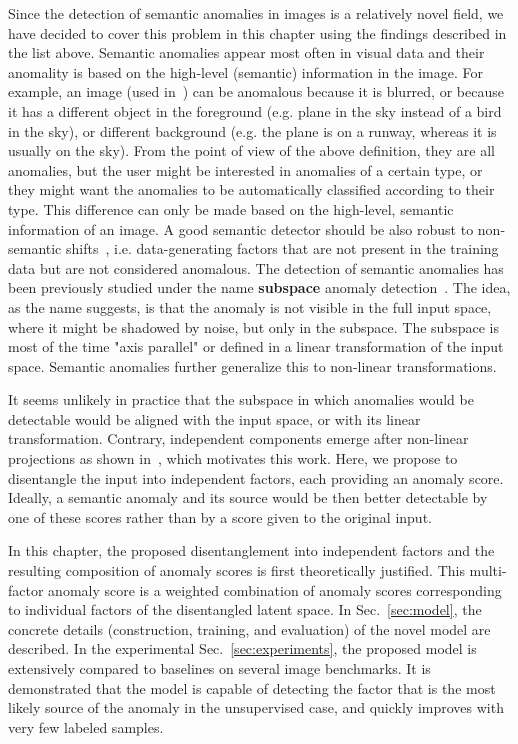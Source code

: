 Since the detection of semantic anomalies in images is a relatively novel field, we have decided to cover this problem in this chapter using the findings described in the list above. Semantic anomalies appear most often in visual data and their anomality is based on the high-level (semantic) information in the image. For example, an image (used in~\cite{vskvara2021comparison}) can be anomalous because it is blurred, or because it has a different object in the foreground (e.g. plane in the sky instead of a bird in the sky), or different background (e.g. the plane is on a runway, whereas it is usually on the sky). From the point of view of the above definition, they are all anomalies, but the user might be interested in anomalies of a certain type, or they might want the anomalies to be automatically classified according to their type. This difference can only be made based on the high-level, semantic information of an image. A good semantic detector should be also robust to non-semantic shifts~\cite{ahmed2021systematic}, i.e. data-generating factors that are not present in the training data but are not considered anomalous. The detection of semantic anomalies has been previously studied under the name \textbf{subspace} anomaly detection~\cite{raz2002semantic, kriegel2009outlier,rahmani2016randomized}. The idea, as the name suggests, is that the anomaly is not visible in the full input space, where it might be shadowed by noise, but only in the subspace. The subspace is most of the time "axis parallel" or defined in a linear transformation of the input space. Semantic anomalies further generalize this to non-linear transformations.

It seems unlikely in practice that the subspace in which anomalies would be detectable would be aligned with the input space, or with its linear transformation. Contrary, independent components emerge after non-linear projections as shown in~\cite{burgess2018understanding, kim2018disentangling, esmaeili2019structuredhfvae, tschannen2018recent, bai2021contrastively, kim2019bayes, deecke2021transfer}, which motivates this work. Here, we propose to disentangle the input into independent factors, each providing an anomaly score. Ideally, a semantic anomaly and its source would be then better detectable by one of these scores rather than by a score given to the original input. 

In this chapter, the proposed disentanglement into independent factors and the resulting composition of anomaly scores is first theoretically justified. This multi-factor anomaly score is a weighted combination of anomaly scores corresponding to individual factors of the disentangled latent space. In Sec.~\ref{sec:model}, the concrete details (construction, training, and evaluation) of the novel model are described. In the experimental Sec.~\ref{sec:experiments}, the proposed model is extensively compared to baselines on several image benchmarks. It is demonstrated that the model is capable of detecting the factor that is the most likely source of the anomaly in the unsupervised case, and quickly improves with very few labeled samples.

